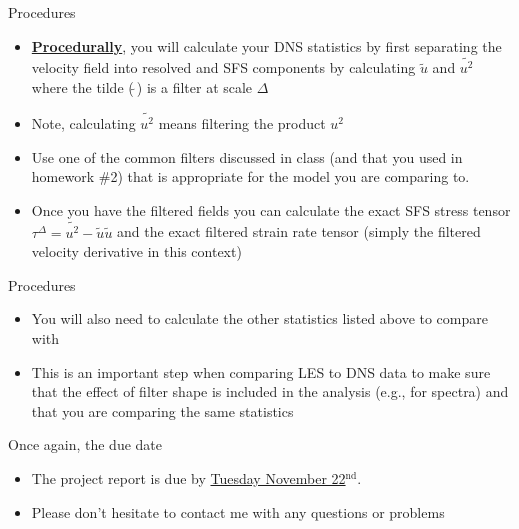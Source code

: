 \begin{frame}{Procedures}
    \begin{itemize}
	\item {\bf \underline{Procedurally}}, you will calculate your DNS statistics by first separating the velocity field into resolved and SFS components by calculating $\tilde{u}$ and $\widetilde{u^2}$ where the tilde ($\tilde{~}$) is a filter at scale $\Delta$
	\item Note, calculating $\widetilde{u^2}$ means filtering the product $u^2$
	\item Use one of the common filters discussed in class (and that you used in homework \#2) that is appropriate for the model you are comparing to.
	\item Once you have the filtered fields you can calculate the exact SFS stress tensor $\tau^{\Delta}=\widetilde{u^2}-\tilde{u}\tilde{u}$ and the exact filtered strain rate tensor (simply the filtered velocity derivative in this context)
	\end{itemize}
\end{frame}

\begin{frame}{Procedures}
    \begin{itemize}
	\item You will also need to calculate the other statistics listed above to compare with
	\item This is an important step when comparing LES to DNS data  to make sure that the effect of filter shape is included in the analysis (e.g., for spectra) and that you are comparing the same statistics
	\end{itemize}
\end{frame}

\begin{frame}{Once again, the due date}
    \begin{itemize}
	\item The project report is due by \underline{Tuesday November 22$^{\text{nd}}$}.  
	\item Please don't hesitate to contact me with any questions or problems
	\end{itemize}
\end{frame}








